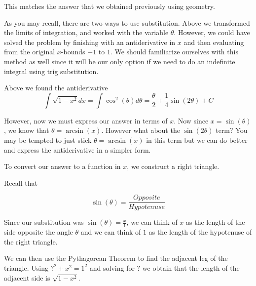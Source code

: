 \documentclass{ximera}
\begin{document}
\begin{example}
\begin{explanation}
    This matches the answer that we obtained previously using geometry. 


As you may recall, there are two ways to use substitution. Above we
transformed the limits of integration, and worked with the variable
$\theta$. However, we could have solved the problem by finishing with
an antiderivative in $x$ and then evaluating from the original $x$-bounds $-1$ to $1$. We should
familiarize ourselves with this method as well since it will be our only option if we need to do 
an indefinite integral using trig substitution. 

 Above we found the antiderivative 
\[
\int \sqrt{1-x^{2}} dx=\int \cos^{2}(\theta) d\theta=\frac{\theta}{2} +\frac{1}{4}\sin(2\theta) + C
\]

    However, now we must express our answer in terms of $x$. Now since $x=\sin(\theta)$, we know
that $\theta=\arcsin(x)$. However what about the $\sin(2\theta)$ term? 
You may be tempted to just stick $\theta=\arcsin(x)$ in this term but we can do better and express the antiderivative
in a simpler form. 
   
    To convert our answer to a function in $x$, we construct a right triangle. 

  Recall that 

\[
\sin(\theta)=\frac{ Opposite}{Hypotenuse}
\]

 Since our substitution was 
$\sin(\theta)=\frac{x}{1}$, we can think of $x$ as the length of the side opposite the angle $\theta$ 
and we can think of $1$ as the length of the hypotenuse of the right triangle. 

    \begin{image}
    \end{image}
   
We can then use the Pythagorean Theorem
to find the adjacent leg of the triangle. Using $?^{2}+x^{2}=1^{2}$ and solving for $?$ we obtain 
that the length of the adjacent side is $\sqrt{1-x^{2}}$. 


\end{explanation}
\end{example}
\end{document}
